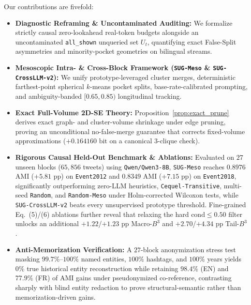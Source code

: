 Our contributions are fivefold:
\begin{itemize}
    \item \textbf{Diagnostic Reframing \& Uncontaminated Auditing:} We formalize strictly causal zero-lookahead real-token budgets alongside an uncontaminated \texttt{all\_shown} unqueried set $U_t$, quantifying exact False-Split asymmetries and minority-pocket geometries on bilingual streams.
    \item \textbf{Mesoscopic Intra- \& Cross-Block Framework (\texttt{SUG-Meso} \& \texttt{SUG-CrossLLM-v2}):} We unify prototype-leveraged cluster merges, deterministic farthest-point spherical $k$-means pocket splits, base-rate-calibrated prompting, and ambiguity-banded $[0.65, 0.85)$ longitudinal tracking.
    \item \textbf{Exact Full-Volume 2D-SE Theory:} Proposition~\ref{prop:exact_prune} derives exact graph- and cluster-volume shrinkage under edge pruning, proving an unconditional no-false-merge guarantee that corrects fixed-volume approximations ($+0.164160\text{ bit}$ on a canonical $3$-clique check).
    \item \textbf{Rigorous Causal Held-Out Benchmark \& Ablations:} Evaluated on $27$ unseen blocks ($65{,}856$ tweets) using \texttt{Qwen/Qwen3-8B}, \texttt{SUG-Meso} reaches $0.8976$ AMI ($+5.81\text{ pp}$) on \texttt{Event2012} and $0.8349$ AMI ($+7.15\text{ pp}$) on \texttt{Event2018}, significantly outperforming zero-LLM heuristics, \texttt{Cequel-Transitive}, multi-seed \texttt{Random}, and \texttt{Random-Meso} under Holm-corrected Wilcoxon tests, while \texttt{SUG-CrossLLM-v2} beats every unsupervised prototype threshold. Fine-grained Eq.~(5)/(6) ablations further reveal that relaxing the hard $\text{cond} \le 0.50$ filter unlocks an additional $+1.22$/$+1.23\text{ pp}$ Macro-$B^3$ and $+2.70$/$+4.34\text{ pp}$ Tail-$B^3$.
    \item \textbf{Anti-Memorization Verification:} A $27$-block anonymization stress test masking $99.7\%$--$100\%$ named entities, $100\%$ hashtags, and $100\%$ years yields $0\%$ true historical entity reconstruction while retaining $98.4\%$ (EN) and $77.9\%$ (FR) of AMI gains under pseudonymized co-reference, contrasting sharply with blind entity redaction to prove structural-semantic rather than memorization-driven gains.
\end{itemize}
